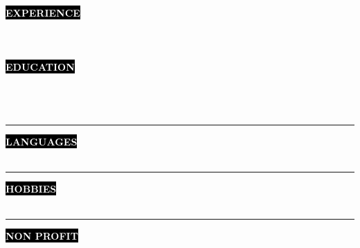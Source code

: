 \documentclass[10pt,A4]{article}
\newcounter{a}
\newcounter{b}
\newcounter{c}
\newcommand{\cvsection}[1] {
	\textcolor{white}{\MakeUppercase{\textbf{#1}}}
}
\newcommand{\cvsect}[1]{
	\colorbox{black}{{\cvsection{#1}}}\\\\%
}
\begin{document}
	\cvsect{Experience}
		\cvexperience
	\\\\
	\cvsect{Education}
		\cveducation
	\\\\
	\begin{minipage}[t]{0.3\textwidth}\hrule height 0pt width 0pt%
    	\cvsect{Languages}
		\cvlanguages
	\end{minipage}%
	\hspace{0cm}
	\begin{minipage}[t]{0.3\textwidth}\hrule height 0pt width 0pt%
		\cvsect{Hobbies}
		\cvhobbies
	\end{minipage}%
	\hspace{2cm}
	\begin{minipage}[t]{0.3\textwidth}\hrule height 0pt width 0pt%
		\cvsect{Non profit}
		\cvnonprofit
	\end{minipage}%
	
\end{document}
